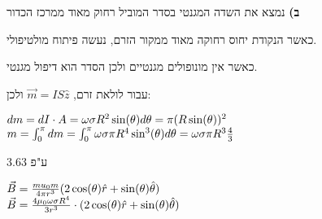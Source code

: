 \documentclass[14pt]{extarticle}
\makeatletter
\newenvironment{lefteqs}{%
    \begin{english}%
    \begin{flushleft}%
    \renewcommand{\arraystretch}{1.3}%
    $\begin{array}{@{}l@{}}%
}{%
    \end{array}$%
    \end{flushleft}%
    \end{english}%
}
\makeatother
\begin{document}
\textbf{ב)}
נמצא את השדה המגנטי בסדר המוביל רחוק מאוד ממרכז הכדור

כאשר הנקודת יחוס רחוקה מאוד ממקור הזרם, נעשה פיתוח מולטיפולי.

כאשר אין מונופולים מגנטיים ולכן הסדר הוא דיפול מגנטי.

עבור לולאת זרם, $\vec{m} = IS \hat{z}$  ולכן:
\begin{lefteqs}
    dm=dI \cdot A = \omega \sigma R^2 \sin(\theta) d\theta = \pi (R\sin(\theta))^2 \\
    m=\int_0^\pi dm = \int_0^\pi \omega \sigma \pi R^4\sin^3(\theta) d\theta = \omega \sigma \pi R^3 \frac{4}{3}
\end{lefteqs}
ע"פ 3.63

\begin{lefteqs}
    \vec{B} = \frac{mu_0 m}{4\pi r^3}(2\cos(\theta)\hat{r} + \sin(\theta)\hat{\theta}) \\
    \vec{B} = \frac{4\mu_0 \omega \sigma R^4}{3r^3} \cdot (2\cos(\theta)\hat{r} + \sin(\theta)\hat{\theta})
\end{lefteqs}
\end{document}
